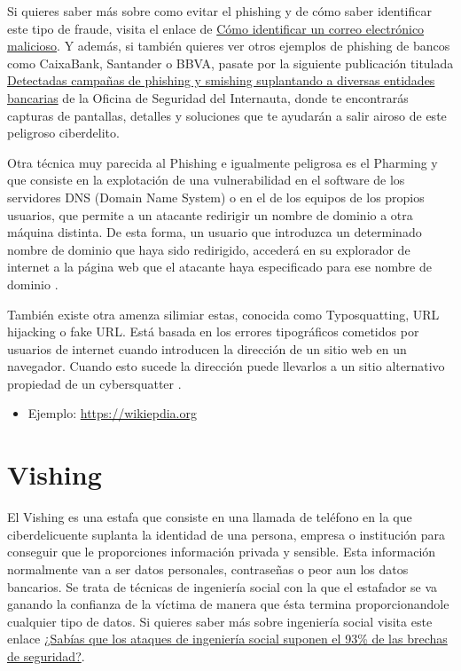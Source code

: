 \documentclass[
  spanish,
  a4paper,
  openany]{book}
\providecommand{\tightlist}{%
  \setlength{\itemsep}{0pt}\setlength{\parskip}{0pt}}
\begin{document}
Si quieres saber más sobre como evitar el phishing y de cómo saber identificar este tipo de fraude, visita el enlace de \href{https://www.osi.es/es/como-identificar-un-correo-electronico-malicioso}{Cómo identificar un correo electrónico malicioso}. Y además, si también quieres ver otros ejemplos de phishing de bancos como CaixaBank, Santander o BBVA, pasate por la siguiente publicación titulada \href{https://www.osi.es/es/actualidad/avisos/2021/06/detectadas-campanas-de-phishing-y-smishing-suplantando-diversas-entidades}{Detectadas campañas de phishing y smishing suplantando a diversas entidades bancarias} de la Oficina de Seguridad del Internauta, donde te encontrarás capturas de pantallas, detalles y soluciones que te ayudarán a salir airoso de este peligroso ciberdelito.

Otra técnica muy parecida al Phishing e igualmente peligrosa es el Pharming y que consiste en la explotación de una vulnerabilidad en el software de los servidores DNS (Domain Name System) o en el de los equipos de los propios usuarios, que permite a un atacante redirigir un nombre de dominio a otra máquina distinta. De esta forma, un usuario que introduzca un determinado nombre de dominio que haya sido redirigido, accederá en su explorador de internet a la página web que el atacante haya especificado para ese nombre de dominio \citep{KASPER-pharming}.

También existe otra amenza silimiar estas, conocida como Typosquatting, URL hijacking o fake URL. Está basada en los errores tipográficos cometidos por usuarios de internet cuando introducen la dirección de un sitio web en un navegador. Cuando esto sucede la dirección puede llevarlos a un sitio alternativo propiedad de un cybersquatter \citep{WIKI-typosquatting}.

\begin{itemize}
\tightlist
\item
  Ejemplo: \url{https://wikiepdia.org}
\end{itemize}

\hypertarget{vishing}{%
\section{Vishing}\label{vishing}}

El Vishing es una estafa que consiste en una llamada de teléfono en la que ciberdelicuente suplanta la identidad de una persona, empresa o institución para conseguir que le proporciones información privada y sensible. Esta información normalmente van a ser datos personales, contraseñas o peor aun los datos bancarios. Se trata de técnicas de ingeniería social con la que el estafador se va ganando la confianza de la víctima de manera que ésta termina proporcionandole cualquier tipo de datos. Si quieres saber más sobre ingeniería social visita este enlace \href{https://www.osi.es/es/actualidad/blog/2019/12/04/sabias-que-los-ataques-de-ingenieria-social-suponen-el-93-de-las-brechas}{¿Sabías que los ataques de ingeniería social suponen el 93\% de las brechas de seguridad?}.
\end{document}
